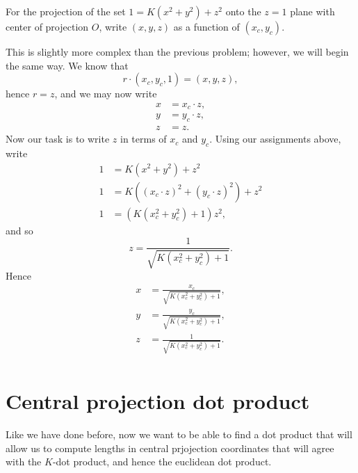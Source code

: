 \documentclass{ximera}
\begin{document}
\begin{problem}
  For the projection of the set $1=K\left(x^{2}+y^{2}\right)+z^{2} $
  onto the $z=1$ plane with center of projection $O$, write $(x,y,z)$
  as a function of $(x_{c},y_{c})$.
  \begin{freeResponse}
    This is slightly more complex than the previous problem; however,
    we will begin the same way. We know that
    \[
    r\cdot(x_{c},y_{c},1)=(x,y,z),
    \]
    hence $r=z$, and we may now write
    \begin{align*}
      x &= x_c\cdot z,\\
      y &= y_c\cdot z,\\
      z &= z.
    \end{align*}
    Now our task is to write $z$ in terms of $x_c$ and $y_c$. Using our assignments above, write
    \begin{align*}
      1 &= K\left(x^2 + y^2\right) + z^2\\
      1 &= K\left((x_c\cdot z)^2 + (y_c\cdot z)^2\right) + z^2\\
      1 &= \left(K\left(x_c^2 + y_c^2\right)+1\right)z^2,
    \end{align*}
    and so
    \[
    z = \frac{1}{\sqrt{K\left(x_c^2 + y_c^2\right)+1}}.
    \]
    Hence
    \begin{align*}
      x &= \frac{x_c}{\sqrt{K\left(x_c^2 + y_c^2\right)+1}},\\
      y &= \frac{y_c}{\sqrt{K\left(x_c^2 + y_c^2\right)+1}},\\
      z &= \frac{1}{\sqrt{K\left(x_c^2 + y_c^2\right)+1}}.\\
    \end{align*}
  \end{freeResponse}
\end{problem}






\section{Central projection dot product}

Like we have done before, now we want to be able to find a dot product
that will allow us to compute lengths in central prjojection
coordinates that will agree with the $K$-dot product, and hence the
euclidean dot product.
\end{document}
